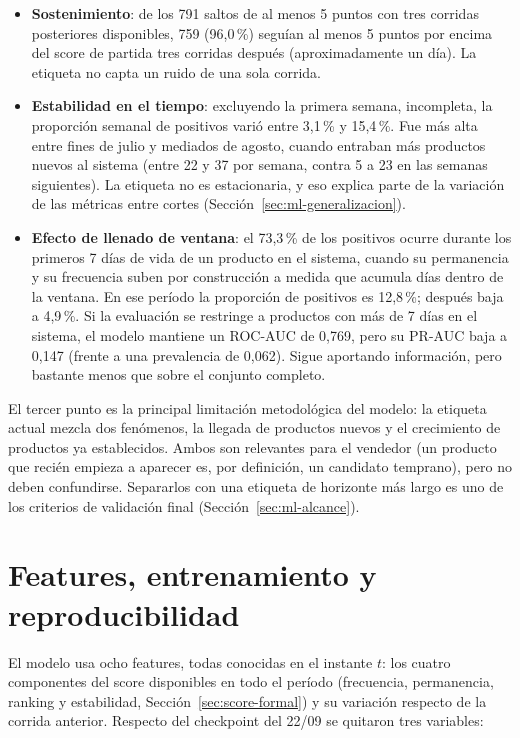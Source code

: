 \begin{itemize}
	\item \textbf{Sostenimiento}: de los 791 saltos de al menos 5 puntos con tres corridas posteriores disponibles, 759 (96,0\,\%) seguían al menos 5 puntos por encima del score de partida tres corridas después (aproximadamente un día). La etiqueta no capta un ruido de una sola corrida.
	\item \textbf{Estabilidad en el tiempo}: excluyendo la primera semana, incompleta, la proporción semanal de positivos varió entre 3,1\,\% y 15,4\,\%. Fue más alta entre fines de julio y mediados de agosto, cuando entraban más productos nuevos al sistema (entre 22 y 37 por semana, contra 5 a 23 en las semanas siguientes). La etiqueta no es estacionaria, y eso explica parte de la variación de las métricas entre cortes (Sección~\ref{sec:ml-generalizacion}).
	\item \textbf{Efecto de llenado de ventana}: el 73,3\,\% de los positivos ocurre durante los primeros 7 días de vida de un producto en el sistema, cuando su permanencia y su frecuencia suben por construcción a medida que acumula días dentro de la ventana. En ese período la proporción de positivos es 12,8\,\%; después baja a 4,9\,\%. Si la evaluación se restringe a productos con más de 7 días en el sistema, el modelo mantiene un ROC-AUC de 0,769, pero su PR-AUC baja a 0,147 (frente a una prevalencia de 0,062). Sigue aportando información, pero bastante menos que sobre el conjunto completo.
\end{itemize}

El tercer punto es la principal limitación metodológica del modelo: la etiqueta actual mezcla dos fenómenos, la llegada de productos nuevos y el crecimiento de productos ya establecidos. Ambos son relevantes para el vendedor (un producto que recién empieza a aparecer es, por definición, un candidato temprano), pero no deben confundirse. Separarlos con una etiqueta de horizonte más largo es uno de los criterios de validación final (Sección~\ref{sec:ml-alcance}).

\section{Features, entrenamiento y reproducibilidad}\label{sec:ml-reproducibilidad}

El modelo usa ocho features, todas conocidas en el instante $t$: los cuatro componentes del score disponibles en todo el período (frecuencia, permanencia, ranking y estabilidad, Sección~\ref{sec:score-formal}) y su variación respecto de la corrida anterior. Respecto del checkpoint del 22/09 se quitaron tres variables:


